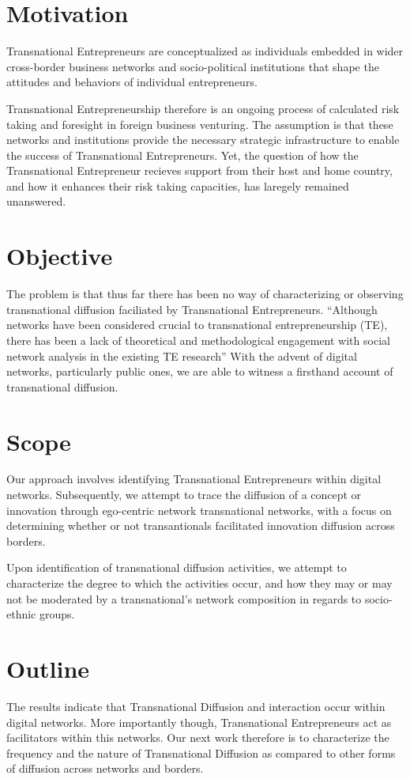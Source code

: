 \section{Motivation}
Transnational Entrepreneurs are conceptualized as individuals embedded
in wider cross-border business networks and socio-political
institutions that shape the attitudes and behaviors of individual
entrepreneurs.

Transnational Entrepreneurship therefore is an ongoing process of
calculated risk taking and foresight in foreign business
venturing. The assumption is that these networks and institutions
provide the necessary strategic infrastructure to enable the success
of Transnational Entrepreneurs. Yet, the question of how the
Transnational Entrepreneur recieves support from their host and home
country, and how it enhances their risk taking capacities, has
laregely remained unanswered.

\section{Objective}
The problem is that thus far there has been no way of characterizing
or observing transnational diffusion faciliated by Transnational
Entrepreneurs. ``Although networks have been considered crucial to
transnational entrepreneurship (TE), there has been a lack of
theoretical and methodological engagement with social network analysis
in the existing TE research''\cite{Chen.2009} With the advent of
digital networks, particularly public ones, we are able to witness a
firsthand account of transnational diffusion.

\section{Scope}
Our approach involves identifying Transnational Entrepreneurs within
digital networks. Subsequently, we attempt to trace the diffusion of a
concept or innovation through ego-centric network transnational
networks, with a focus on determining whether or not transantionals
facilitated innovation diffusion across borders.

Upon identification of transnational diffusion activities, we attempt
to characterize the degree to which the activities occur, and how they
may or may not be moderated by a transnational's network composition
in regards to socio-ethnic groups.

\section{Outline}
The results indicate that Transnational Diffusion and interaction
occur within digital networks. More importantly though, Transnational
Entrepreneurs act as facilitators within this networks. Our next work
therefore is to characterize the frequency and the nature of
Transnational Diffusion as compared to other forms of diffusion across
networks and borders.
